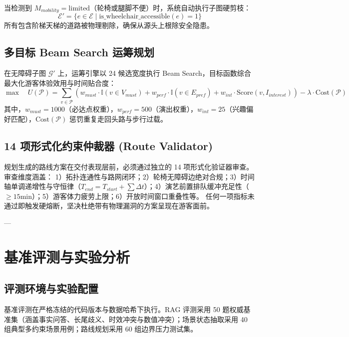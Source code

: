 \documentclass[11pt,a4paper]{ctexart}
\begin{document}
当检测到 $M_{mobility} = \text{limited}$（轮椅或腿脚不便）时，系统自动执行子图硬剪枝：
\begin{equation}
    \mathcal{E}' = \{ e \in \mathcal{E} \mid \text{is\_wheelchair\_accessible}(e) = 1 \}
\end{equation}
所有包含阶梯天梯的道路被物理剔除，确保从源头上根除安全隐患。

\subsection{多目标 Beam Search 运筹规划}
在无障碍子图 $\mathcal{G}'$ 上，运筹引擎以 24 候选宽度执行 Beam Search，目标函数综合最大化游客体验效用与时间贴合度：
\begin{equation}
    \max \quad U(\mathcal{P}) = \sum_{v \in \mathcal{P}} \left( w_{must} \cdot \mathbb{I}(v \in V_{must}) + w_{perf} \cdot \mathbb{I}(v \in E_{pref}) + w_{int} \cdot \text{Score}(v, I_{interest}) \right) - \lambda \cdot \text{Cost}(\mathcal{P})
\end{equation}
其中，$w_{must} = 1000$（必达点权重），$w_{perf} = 500$（演出权重），$w_{int} = 25$（兴趣偏好匹配），$\text{Cost}(\mathcal{P})$ 惩罚重复走回头路与步行过载。

\subsection{14 项形式化约束仲裁器 (Route Validator)}
规划生成的路线方案在交付表现层前，必须通过独立的 14 项形式化验证器审查。审查维度涵盖：
1）拓扑连通性与路网闭环；2）轮椅无障碍边绝对合规；3）时间轴单调递增性与守恒律（$T_{end} = T_{start} + \sum \Delta t$）；4）演艺前置排队缓冲充足性（$\ge 15\text{min}$）；5）游客体力疲劳上限；6）开放时间窗口重叠性等。
任何一项指标未通过即触发硬熔断，坚决杜绝带有物理漏洞的方案呈现在游客面前。

---

\section{基准评测与实验分析}

\subsection{评测环境与实验配置}
基准评测在严格冻结的代码版本与数据哈希下执行。RAG 评测采用 50 题权威基准集（涵盖事实问答、长尾歧义、时效冲突与数值冲突）；场景状态抽取采用 40 组典型多约束场景用例；路线规划采用 60 组边界压力测试集。
\end{document}
